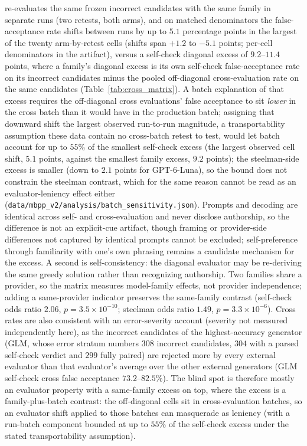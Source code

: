 \documentclass[a4paper,journal]{IAENGtran}
\begin{document}
re-evaluates the same frozen
incorrect candidates with the same family in separate runs (two retests, both
arms), and on matched denominators the false-acceptance rate shifts between runs
by up to $5.1$ percentage points in the largest of the twenty arm-by-retest cells
(shifts span $+1.2$ to $-5.1$ points; per-cell denominators in the artifact),
versus a self-check diagonal excess of $9.2$--$11.4$ points, where a family's
diagonal excess is its own self-check false-acceptance rate on its incorrect
candidates minus the pooled off-diagonal cross-evaluation rate on the same
candidates (Table~\ref{tab:cross_matrix}). A batch explanation of
that excess requires the off-diagonal cross evaluations' false acceptance to sit
\emph{lower} in the cross batch than it would have in the production batch; assigning
that downward shift the largest observed run-to-run magnitude, a transportability
assumption these data contain no cross-batch retest to test, would let batch account
for up to $55\%$
of the smallest self-check excess (the largest observed cell shift, $5.1$ points,
against the smallest family excess, $9.2$ points);
the steelman-side excess is smaller (down to $2.1$ points for GPT-6-Luna), so the
bound does not constrain the steelman contrast, which for the same reason cannot be
read as an evaluator-leniency effect either
(\texttt{data/mbpp\_v2/analysis/}\allowbreak\texttt{batch\_sensitivity.json}). Prompts and decoding
are identical across self- and cross-evaluation and never disclose authorship, so the
difference is not an explicit-cue artifact, though framing or provider-side differences
not captured by identical prompts cannot be excluded; self-preference through familiarity with one's
own phrasing remains a candidate mechanism for the excess. A second is
self-consistency: the diagonal evaluator may be re-deriving the same greedy solution
rather than recognizing authorship. Two families share a provider, so the matrix
measures model-family effects, not provider independence; adding a same-provider
indicator preserves the same-family contrast (self-check odds ratio $2.06$,
$p=3.5\times10^{-10}$; steelman odds ratio $1.49$, $p=3.3\times10^{-6}$).
Cross rates are also consistent with an error-severity account (severity not measured
independently here), as the incorrect candidates of the highest-accuracy
generator (GLM, whose error stratum numbers $308$ incorrect candidates, $304$
with a parsed self-check verdict and $299$ fully paired)
are rejected more by
every external evaluator than that evaluator's average over the other external generators (GLM self-check
cross false acceptance $73.2$--$82.5\%$). The blind spot is therefore mostly an
evaluator property with a same-family excess on top, where the excess is a
family-plus-batch contrast: the off-diagonal cells sit in cross-evaluation batches,
so an evaluator shift applied to those batches can masquerade as leniency (with a run-batch component bounded
at up to $55\%$ of the self-check excess under the stated transportability assumption).
\end{document}

